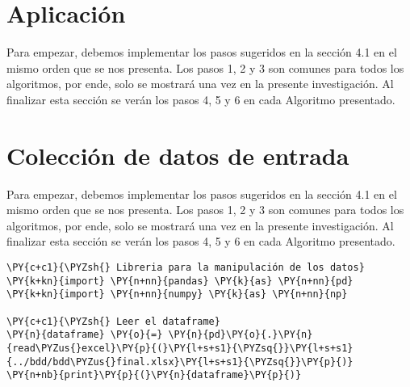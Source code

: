      \hypertarget{apliacaciuxf3n-del-muxe9todo}{%
\section{Aplicación}\label{apliacaciuxf3n-del-muxe9todo}}

Para empezar, debemos implementar los pasos sugeridos en la sección 4.1
en el mismo orden que se nos presenta. Los pasos 1, 2 y 3 son comunes
para todos los algoritmos, por ende, solo se mostrará una vez en la
presente investigación. Al finalizar esta sección se verán los pasos 4,
5 y 6 en cada Algoritmo presentado.

    \hypertarget{colecciuxf3n-de-datos-de-entrada}{%
\section{Colección de datos de
entrada}\label{colecciuxf3n-de-datos-de-entrada}}

Para empezar, debemos implementar los pasos sugeridos en la sección 4.1
en el mismo orden que se nos presenta. Los pasos 1, 2 y 3 son comunes
para todos los algoritmos, por ende, solo se mostrará una vez en la
presente investigación. Al finalizar esta sección se verán los pasos 4,
5 y 6 en cada Algoritmo presentado.

    \begin{tcolorbox}[breakable, size=fbox, boxrule=1pt, pad at break*=1mm,colback=cellbackground, colframe=cellborder]
\begin{Verbatim}[commandchars=\\\{\}]
\PY{c+c1}{\PYZsh{} Libreria para la manipulación de los datos}
\PY{k+kn}{import} \PY{n+nn}{pandas} \PY{k}{as} \PY{n+nn}{pd}
\PY{k+kn}{import} \PY{n+nn}{numpy} \PY{k}{as} \PY{n+nn}{np}

\PY{c+c1}{\PYZsh{} Leer el dataframe}
\PY{n}{dataframe} \PY{o}{=} \PY{n}{pd}\PY{o}{.}\PY{n}{read\PYZus{}excel}\PY{p}{(}\PY{l+s+s1}{\PYZsq{}}\PY{l+s+s1}{../bdd/bdd\PYZus{}final.xlsx}\PY{l+s+s1}{\PYZsq{}}\PY{p}{)}
\PY{n+nb}{print}\PY{p}{(}\PY{n}{dataframe}\PY{p}{)}
\end{Verbatim}
\end{tcolorbox}

